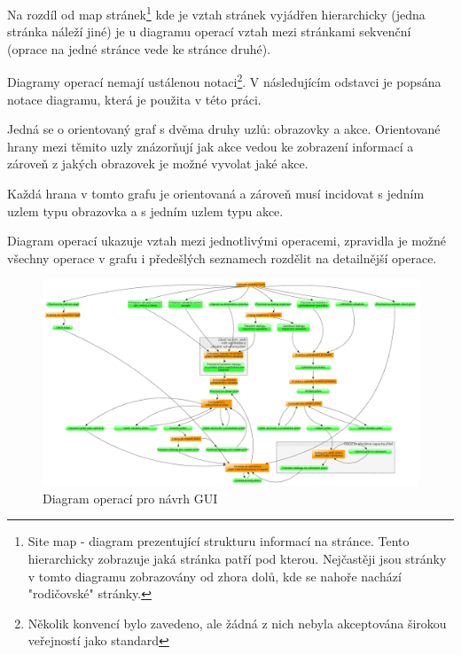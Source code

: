 Na rozdíl od map stránek\footnote{Site map - diagram prezentující strukturu informací na stránce. Tento hierarchicky zobrazuje jaká stránka patří pod kterou. Nejčastěji jsou stránky v tomto diagramu zobrazovány od zhora dolů, kde se nahoře nachází "rodičovské" stránky\cite{brown2007communicating}.} kde je vztah stránek vyjádřen hierarchicky (jedna stránka náleží jiné) je u diagramu operací vztah mezi stránkami sekvenční (oprace na jedné stránce vede ke stránce druhé)\cite{brown2007communicating}.

Diagramy operací nemají ustálenou notaci\footnote{Několik konvencí bylo zavedeno, ale žádná z nich nebyla akceptována širokou veřejností jako standard\cite{brown2007communicating}}. V následujícím odstavci je popsána notace diagramu, která je použita v této práci.  

Jedná se o orientovaný graf s dvěma druhy uzlů: obrazovky a akce. Orientované hrany mezi těmito uzly znázorňují jak akce vedou ke zobrazení informací a zároveň z jakých obrazovek je možné vyvolat jaké akce.

Každá hrana v tomto grafu je orientovaná a zároveň musí incidovat s jedním uzlem typu obrazovka a s jedním uzlem typu akce.

Diagram operací ukazuje vztah mezi jednotlivými operacemi, zpravidla je možné všechny operace v grafu i předešlých seznamech rozdělit na detailnější operace.

\begin{figure}[htb]
\begin{center}
\includegraphics[width=150mm]{./pictures/taskGraph.png}
\caption{Diagram operací pro návrh GUI}
\label{fig:taskGraph}
\end{center}
\end{figure}

